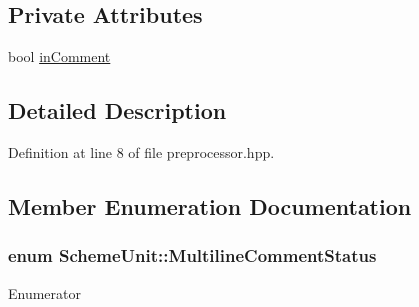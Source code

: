 \subsection*{Private Attributes}
\begin{DoxyCompactItemize}
\item 
bool \hyperlink{class_scheme_unit_adcc6f95c968825e3e31d5203ce84e2e8}{in\+Comment}
\end{DoxyCompactItemize}


\subsection{Detailed Description}


Definition at line 8 of file preprocessor.\+hpp.



\subsection{Member Enumeration Documentation}
\hypertarget{class_scheme_unit_a90a5ac4883401fe1c38226a54ce9f43d}{}
\subsubsection[{Multiline\+Comment\+Status}]{\setlength{\rightskip}{0pt plus 5cm}enum {\bf Scheme\+Unit\+::\+Multiline\+Comment\+Status}\hspace{0.3cm}{\ttfamily [private]}}\label{class_scheme_unit_a90a5ac4883401fe1c38226a54ce9f43d}
\begin{Desc}
\item[Enumerator]\par
\begin{description}
\item[{\em 
\hypertarget{class_scheme_unit_a90a5ac4883401fe1c38226a54ce9f43dafd3c8126c0b4840138b5586975c6c24e}{}Neutral\label{class_scheme_unit_a90a5ac4883401fe1c38226a54ce9f43dafd3c8126c0b4840138b5586975c6c24e}
}]\item[{\em 
\hypertarget{class_scheme_unit_a90a5ac4883401fe1c38226a54ce9f43da92f34af4ca75d006abe1f83629308d9d}{}Comment\+Start\label{class_scheme_unit_a90a5ac4883401fe1c38226a54ce9f43da92f34af4ca75d006abe1f83629308d9d}
}]\item[{\em 
\hypertarget{class_scheme_unit_a90a5ac4883401fe1c38226a54ce9f43da9e9ce5882d904a46fe5fc0daa9f7194a}{}Comment\+End\label{class_scheme_unit_a90a5ac4883401fe1c38226a54ce9f43da9e9ce5882d904a46fe5fc0daa9f7194a}
}]\end{description}
\end{Desc}


